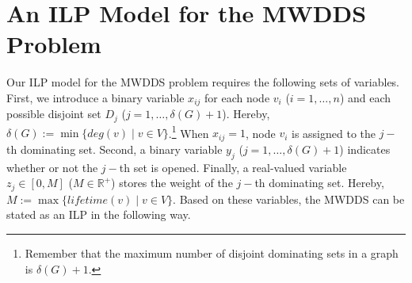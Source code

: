 \documentclass[algorithms,article,accept,moreauthors,pdftex]{Definitions/mdpi}
\begin{document}

\section{An ILP Model for the MWDDS Problem}
\label{sec:ilp-model}

Our ILP model for the MWDDS problem requires the following sets of variables. First, we introduce a binary variable $x_{ij}$ for each node $v_i$ ($i=1,\ldots,n$) and each possible disjoint set $D_j$ ($j=1,\ldots,\delta(G) + 1$). Hereby, $\delta(G) := \min \{deg(v) \mid v \in V\}$.\footnote{Remember that the maximum number of disjoint dominating sets in a graph is $\delta(G) + 1$.} When $x_{ij} = 1$, node $v_i$ is assigned to the $j-$th dominating set. Second, a binary variable $y_j$ ($j=1,\ldots,\delta(G) + 1$) indicates whether or not the $j-$th set is opened. Finally, a real-valued variable $z_j \in [0,M]$ ($M \in \mathbb{R}^+$) stores the weight of the $j-$th dominating set. Hereby, $M := \max \{lifetime(v) \mid v \in V\}$. Based on these variables, the MWDDS can be stated as an ILP in the following way. 
\end{document}
